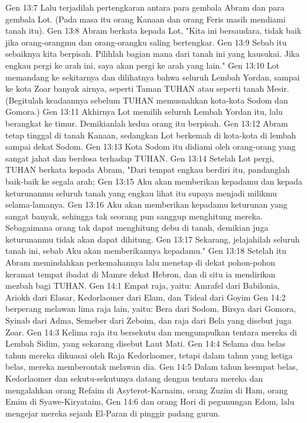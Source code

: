 Gen 13:7  Lalu terjadilah pertengkaran antara para gembala Abram dan para gembala Lot. (Pada masa itu orang Kanaan dan orang Feris masih mendiami tanah itu).
Gen 13:8  Abram berkata kepada Lot, "Kita ini bersaudara, tidak baik jika orang-orangmu dan orang-orangku saling bertengkar.
Gen 13:9  Sebab itu sebaiknya kita berpisah. Pilihlah bagian mana dari tanah ini yang kausukai. Jika engkau pergi ke arah ini, saya akan pergi ke arah yang lain."
Gen 13:10  Lot memandang ke sekitarnya dan dilihatnya bahwa seluruh Lembah Yordan, sampai ke kota Zoar banyak airnya, seperti Taman TUHAN atau seperti tanah Mesir. (Begitulah keadaannya sebelum TUHAN memusnahkan kota-kota Sodom dan Gomora.)
Gen 13:11  Akhirnya Lot memilih seluruh Lembah Yordan itu, lalu berangkat ke timur. Demikianlah kedua orang itu berpisah.
Gen 13:12  Abram tetap tinggal di tanah Kanaan, sedangkan Lot berkemah di kota-kota di lembah sampai dekat Sodom.
Gen 13:13  Kota Sodom itu didiami oleh orang-orang yang sangat jahat dan berdosa terhadap TUHAN.
Gen 13:14  Setelah Lot pergi, TUHAN berkata kepada Abram, "Dari tempat engkau berdiri itu, pandanglah baik-baik ke segala arah;
Gen 13:15  Aku akan memberikan kepadamu dan kepada keturunanmu seluruh tanah yang engkau lihat itu supaya menjadi milikmu selama-lamanya.
Gen 13:16  Aku akan memberikan kepadamu keturunan yang sangat banyak, sehingga tak seorang pun sanggup menghitung mereka. Sebagaimana orang tak dapat menghitung debu di tanah, demikian juga keturunanmu tidak akan dapat dihitung.
Gen 13:17  Sekarang, jelajahilah seluruh tanah ini, sebab Aku akan memberikannya kepadamu."
Gen 13:18  Setelah itu Abram memindahkan perkemahannya lalu menetap di dekat pohon-pohon keramat tempat ibadat di Mamre dekat Hebron, dan di situ ia mendirikan mezbah bagi TUHAN.
Gen 14:1  Empat raja, yaitu: Amrafel dari Babilonia, Ariokh dari Elasar, Kedorlaomer dari Elam, dan Tideal dari Goyim
Gen 14:2  berperang melawan lima raja lain, yaitu: Bera dari Sodom, Birsya dari Gomora, Syinab dari Adma, Semeber dari Zeboim, dan raja dari Bela yang disebut juga Zoar.
Gen 14:3  Kelima raja itu bersekutu dan mengumpulkan tentara mereka di Lembah Sidim, yang sekarang disebut Laut Mati.
Gen 14:4  Selama dua belas tahun mereka dikuasai oleh Raja Kedorlaomer, tetapi dalam tahun yang ketiga belas, mereka memberontak melawan dia.
Gen 14:5  Dalam tahun keempat belas, Kedorlaomer dan sekutu-sekutunya datang dengan tentara mereka dan mengalahkan orang Refaim di Asyterot-Karnaim, orang Zuzim di Ham, orang Emim di Syawe-Kiryataim,
Gen 14:6  dan orang Hori di pegunungan Edom, lalu mengejar mereka sejauh El-Paran di pinggir padang gurun.
